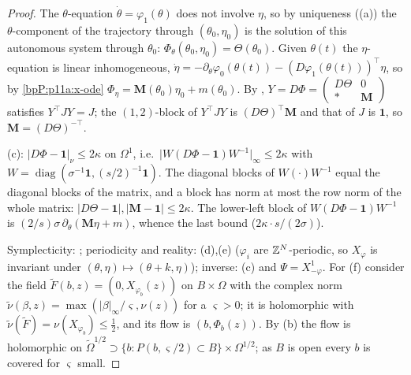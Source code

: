 \begin{proof}
\label{stepP:p11a:af-simple} The $\theta$-equation $\dot\theta=\varphi_1(\theta)$ does not involve $\eta$, so by uniqueness ((a)) the $\theta$-component of the trajectory through $(\theta_0,\eta_0)$ is the solution of this autonomous system through $\theta_0$: $\Phi_\theta(\theta_0,\eta_0)=\Theta(\theta_0)$. Given $\theta(t)$ the $\eta$-equation is linear inhomogeneous, $\dot\eta=-\partial_\theta\varphi_0(\theta(t))-(D\varphi_1(\theta(t)))^\top\eta$, so by \ref{bpP:p11a:x-ode} $\Phi_\eta=\mathbf M(\theta_0)\eta_0+m(\theta_0)$. By , $Y=D\Phi=\begin{pmatrix}D\Theta&0\\ *&\mathbf M\end{pmatrix}$ satisfies $Y^\top JY=J$; the $(1,2)$-block of $Y^\top JY$ is $(D\Theta)^\top\mathbf M$ and that of $J$ is $\mathbf 1$, so $\mathbf M=(D\Theta)^{-\top}$.

\label{stepP:p11a:af-deriv} (c): $\lvert D\Phi-\mathbf 1\rvert_\nu\le2\kappa$ on $\Omega^1$, i.e.\ $\lvert W(D\Phi-\mathbf 1)W^{-1}\rvert_\infty\le2\kappa$ with $W=\operatorname{diag}(\sigma^{-1}\mathbf 1,(s/2)^{-1}\mathbf 1)$. The diagonal blocks of $W(\cdot)W^{-1}$ equal the diagonal blocks of the matrix, and a block has norm at most the row norm of the whole matrix: $\lvert D\Theta-\mathbf 1\rvert,\lvert\mathbf M-\mathbf 1\rvert\le2\kappa$. The lower-left block of $W(D\Phi-\mathbf 1)W^{-1}$ is $(2/s)\sigma\,\partial_\theta(\mathbf M\eta+m)$, whence the last bound ($2\kappa\cdot s/(2\sigma)$).

\label{stepP:p11a:af-rest} Symplecticity: ; periodicity and reality: (d),(e) ($\varphi_i$ are $\mathbb{Z}^N$-periodic, so $X_\varphi$ is invariant under $(\theta,\eta)\mapsto(\theta+k,\eta)$); inverse: (c) and $\Psi=X^1_{-\varphi}$. For (f) consider the field $\tilde F(b,z)=(0,X_{\varphi_b}(z))$ on $B\times\Omega$ with the complex norm $\tilde\nu(\beta,z)=\max(\lvert\beta\rvert_\infty/\varsigma,\nu(z))$ for a $\varsigma>0$; it is holomorphic with $\tilde\nu(\tilde F)=\nu(X_{\varphi_b})\le\frac12$, and its flow is $(b,\Phi_b(z))$. By (b) the flow is holomorphic on $\tilde\Omega^{1/2}\supset\{b:P(b,\varsigma/2)\subset B\}\times\Omega^{1/2}$; as $B$ is open every $b$ is covered for $\varsigma$ small.
\end{proof}

